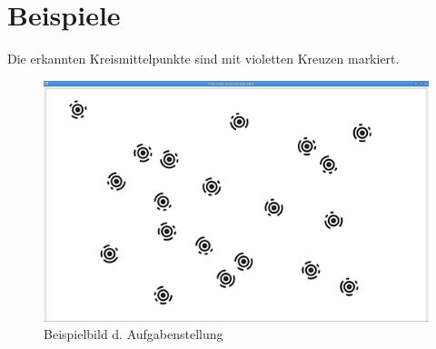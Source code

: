 \section{Beispiele}
Die erkannten Kreismittelpunkte sind mit violetten Kreuzen markiert.
\begin{figure}[!ht]
	\centering	
	\includegraphics[width=\textwidth]{Grafiken/sek1bsp1}
	\caption{Beispielbild d. Aufgabenstellung}
\end{figure}
